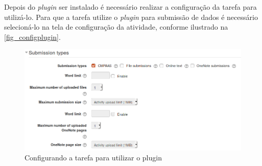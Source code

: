 \documentclass[
	12pt,				%
	openright,			%
	oneside,			%
	a4paper,			%
	english,			%
	french,				%
	spanish,			%
	brazil				%
	]{abntex2}
\begin{document}
Depois do \textit{plugin} ser instalado é necessário realizar a configuração da tarefa para utilizá-lo. Para que a tarefa utilize o \textit{plugin} para submissão de dados é necessário selecioná-lo na tela de configuração da atividade, conforme ilustrado na \autoref{fig_configplugin}.

\begin{figure}[htb]
	\caption{\label{fig_configplugin} Configurando a tarefa para utilizar o plugin}
	\begin{center}
		\includegraphics[scale=0.4]{configplugin.png}
	\end{center}
\end{figure}
\end{document}
